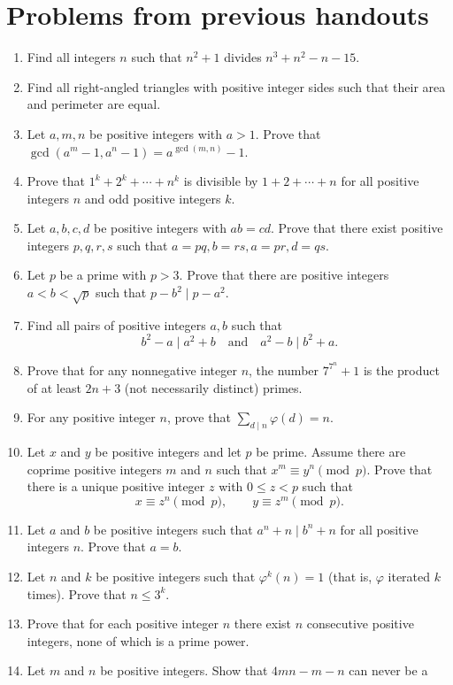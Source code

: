 \documentclass{article}
\begin{document}
\section{Problems from previous handouts}
\begin{enumerate}
  \item Find all integers $n$ such that $n^2+1$ divides $n^3+n^2-n-15$.
  \item Find all right-angled triangles with positive integer sides 
    such that their area and perimeter are equal.
  \item Let $a,m,n$ be positive integers with $a>1$.
    Prove that $\gcd(a^m-1,a^n-1)=a^{\gcd(m,n)}-1$.
  \item Prove that $1^k+2^k+\cdots+n^k$ is divisible by $1+2+\cdots+n$ for
    all positive integers $n$ and odd positive integers $k$.
  \item Let $a,b,c,d$ be positive integers with $ab=cd$. Prove that there
    exist positive integers $p,q,r,s$ such that \(a=pq,b=rs,a=pr,d=qs\).
  \item Let $p$ be a prime with $p>3$. Prove that there are positive integers
    $a<b<\sqrt p$ such that $p-b^2\mid p-a^2$.
  \item Find all pairs of positive integers $a,b$ such that \[b^2-a\mid
      a^2+b\quad\text{and}\quad a^2-b\mid b^2+a.\]
  \item Prove that for any nonnegative integer $n$, the number $7^{7^n}+1$ is
    the product of at least $2n+3$ (not necessarily distinct) primes.
  \item For any positive integer $n$, prove that $\displaystyle\sum_{d\mid
    n}\varphi(d)=n$.
  \item Let $x$ and $y$ be positive integers and let $p$ be prime. Assume there
    are coprime positive integers $m$ and $n$ such that $x^m\equiv y^n\pmod p$.
    Prove that there is a unique positive integer $z$ with $0\le z<p$ such that
    \[x\equiv z^n\pmod p,\qquad y\equiv z^m\pmod p.\]
  \item Let $a$ and $b$ be positive integers such that $a^n+n\mid b^n+n$ for all
    positive integers $n$. Prove that $a=b$.
  \item Let $n$ and $k$ be positive integers such that $\varphi^k(n)=1$ (that
    is, $\varphi$ iterated $k$ times). Prove that
    $n\le 3^k$.
  \item Prove that for each positive integer $n$ there exist $n$ consecutive
    positive integers, none of which is a prime power.
  \item Let $m$ and $n$ be positive integers. Show that $4mn-m-n$ can never be a

\end{enumerate}
\end{document}
